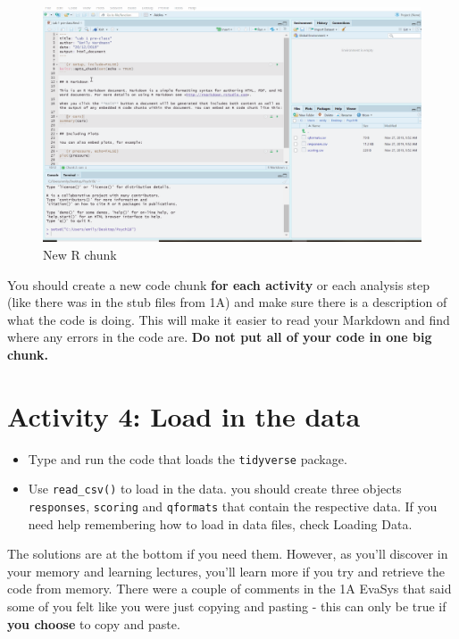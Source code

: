 \documentclass[
  oneside]{book}
\providecommand{\tightlist}{%
  \setlength{\itemsep}{0pt}\setlength{\parskip}{0pt}}
\begin{document}
\begin{figure}

{\centering \includegraphics[width=1\linewidth]{images/markdown-code_chunks} 

}

\caption{New R chunk}\label{fig:img-new-chunkb}
\end{figure}

You should create a new code chunk \textbf{for each activity} or each analysis step (like there was in the stub files from 1A) and make sure there is a description of what the code is doing. This will make it easier to read your Markdown and find where any errors in the code are. \textbf{Do not put all of your code in one big chunk.}

\hypertarget{activity-4-load-in-the-data}{%
\section{Activity 4: Load in the data}\label{activity-4-load-in-the-data}}

\begin{itemize}
\tightlist
\item
  Type and run the code that loads the \texttt{tidyverse} package.
\item
  Use \texttt{read\_csv()} to load in the data. you should create three objects \texttt{responses}, \texttt{scoring} and \texttt{qformats} that contain the respective data. If you need help remembering how to load in data files, check Loading Data.
\end{itemize}

\begin{info}
The solutions are at the bottom if you need them. However, as you'll
discover in your memory and learning lectures, you'll learn more if you
try and retrieve the code from memory. There were a couple of comments
in the 1A EvaSys that said some of you felt like you were just copying
and pasting - this can only be true if \textbf{you choose} to copy and
paste.
\end{info}
\end{document}
